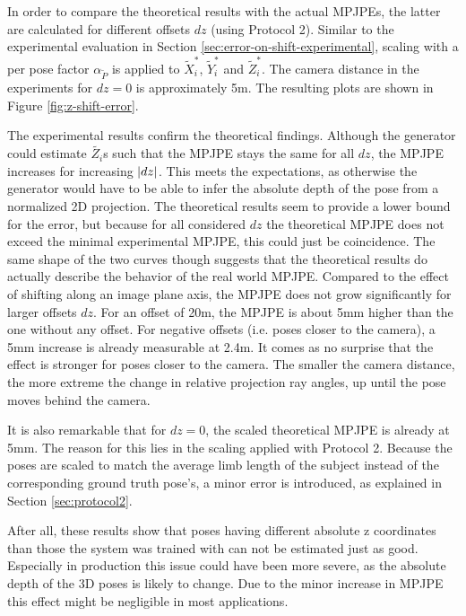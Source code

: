 

In order to compare the theoretical results with the actual MPJPEs, the latter are calculated for different offsets $dz$ (using Protocol 2).
Similar to the experimental evaluation in Section \ref{sec:error-on-shift-experimental}, scaling with a per pose factor $\alpha_{\widetilde{P}}$ is applied to $\widetilde{X}_i^\ast$, $\widetilde{Y}_i^\ast$ and $\widetilde{Z}_i^\ast$.
The camera distance in the experiments for $dz = 0$ is approximately 5m.
The resulting plots are shown in Figure \ref{fig:z-shift-error}.

The experimental results confirm the theoretical findings.
Although the generator could estimate $\widetilde{Z_i}$s such that the MPJPE stays the same for all $dz$, the MPJPE increases for increasing $\abs{dz}$.
This meets the expectations, as otherwise the generator would have to be able to infer the absolute depth of the pose from a normalized 2D projection.
The theoretical results seem to provide a lower bound for the error, but because for all considered $dz$ the theoretical MPJPE does not exceed the minimal experimental MPJPE, this could just be coincidence.
The same shape of the two curves though suggests that the theoretical results do actually describe the behavior of the real world MPJPE.
Compared to the effect of shifting along an image plane axis, the MPJPE does not grow significantly for larger offsets $dz$.
For an offset of 20m, the MPJPE is about 5mm higher than the one without any offset.
For negative offsets (i.e. poses closer to the camera), a 5mm increase is already measurable at 2.4m.
It comes as no surprise that the effect is stronger for poses closer to the camera.
The smaller the camera distance, the more extreme the change in relative projection ray angles, up until the pose moves behind the camera.

It is also remarkable that for $dz = 0$, the scaled theoretical MPJPE is already at 5mm.
The reason for this lies in the scaling applied with Protocol 2.
Because the poses are scaled to match the average limb length of the subject instead of the corresponding ground truth pose's, a minor error is introduced, as explained in Section \ref{sec:protocol2}.

After all, these results show that poses having different absolute z coordinates than those the system was trained with can not be estimated just as good.
Especially in production this issue could have been more severe, as the absolute depth of the 3D poses is likely to change.
Due to the minor increase in MPJPE this effect might be negligible in most applications.


